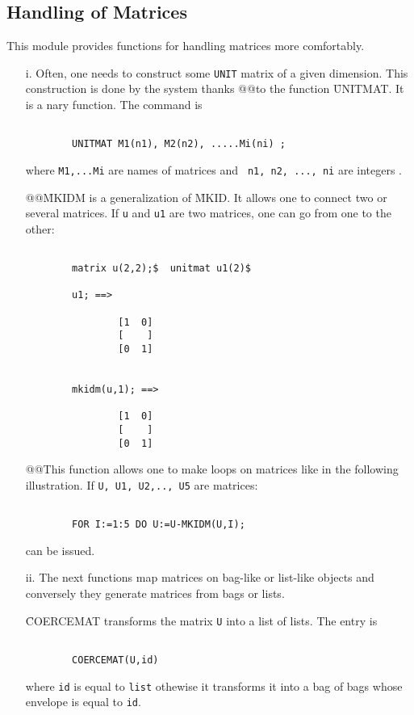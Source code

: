 \subsection{Handling of Matrices}
This module provides functions for handling matrices more comfortably.
\begin{itemize}
\item[i.]
Often, one needs to construct some {\tt UNIT} matrix of
a given dimension. This construction is done by the system thanks
@@to the function \f{UNITMAT}. It is a nary function. The command is
\begin{verbatim}

        UNITMAT M1(n1), M2(n2), .....Mi(ni) ;

\end{verbatim}
where \verb+M1,...Mi+ are names of matrices and
\verb+ n1, n2, ..., ni+ are integers .

@@\f{MKIDM} is a generalization of \f{MKID}. It allows one to connect
two or several matrices. If \verb+u+ and \verb+u1+ are two matrices,
one can go from one to the other:
\begin{verbatim}

        matrix u(2,2);$  unitmat u1(2)$

        u1; ==>

                [1  0]
                [    ]
                [0  1]


        mkidm(u,1); ==>

                [1  0]
                [    ]
                [0  1]

\end{verbatim}
@@This function allows one to make loops on matrices like in the following
illustration. If \verb+U, U1, U2,.., U5+ are matrices:
\begin{verbatim}

        FOR I:=1:5 DO U:=U-MKIDM(U,I);

\end{verbatim}
can be issued.
\item[ii.]
The next functions map matrices on bag-like or list-like objects
and conversely  they generate matrices from bags or lists.

\f{COERCEMAT} transforms the matrix \verb+U+ into a list of lists.
The entry is
\begin{verbatim}

        COERCEMAT(U,id)

\end{verbatim}
where \verb+id+ is equal to \verb+list+ othewise it transforms it into
a bag of bags whose envelope is equal to \verb+id+.


\end{itemize}
